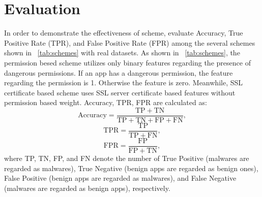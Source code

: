 \chapter{Evaluation}\label{sec:evaluation} 
In order to demonstrate the effectiveness of \our scheme, \We evaluate Accuracy, True Positive Rate (TPR), and False Positive Rate (FPR) among the several schemes shown in \tablename~\ref{tab:schemes} with real datasets. 
As shown in \tablename~\ref{tab:schemes}, the permission besed scheme utilizes only binary features regarding the presence of dangerous permissions.
If an app has a dangerous permission, the feature regarding the permission is 1.
Otherwise the feature is zero.  
Meanwhile, SSL certificate based scheme uses SSL server certificate based features without permission based weight.
Accuracy, TPR, FPR are calculated as:
\begin{equation}
  \mathrm{Accuracy} = \frac{\mathrm{TP}+\mathrm{TN}}{\mathrm{TP} + \mathrm{TN} + \mathrm{FP} + \mathrm{FN}}, 
\end{equation}
\begin{equation}
  \mathrm{TPR} = \frac{\mathrm{TP}}{\mathrm{TP + FN}},
\end{equation}
\begin{equation}
  \mathrm{FPR} = \frac{\mathrm{FP}}{\mathrm{FP + TN}},
\end{equation}
where TP, TN, FP, and FN denote the number of True Positive (malwares are regarded as malwares), True Negative (benign apps are regarded as benign ones), False Positive (benign apps are regarded as malwares), and False Negative (malwares are regarded as benign apps), respectively.  

